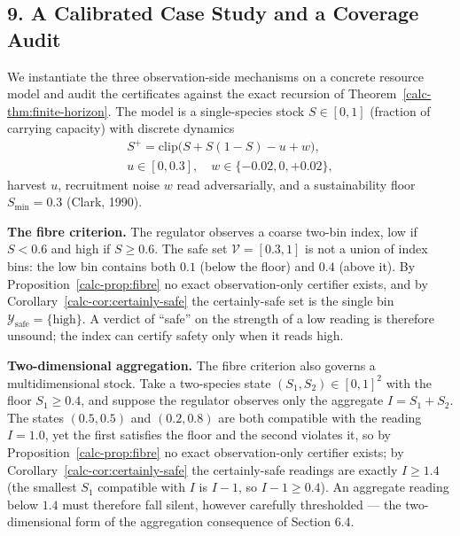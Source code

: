 \documentclass[10pt,twocolumn]{article}
\theoremstyle{definition}
\begin{document}
\subsection{9. A Calibrated Case Study and a Coverage Audit}\label{calc-case-study}

We instantiate the three observation-side mechanisms on a concrete resource model and audit the certificates against the exact recursion of Theorem~\ref{calc-thm:finite-horizon}. The model is a single-species stock \(S \in [0,1]\) (fraction of carrying capacity) with discrete dynamics
\[
\begin{gathered}
S^{+} = \mathrm{clip}\bigl(S + S(1-S) - u + w\bigr),\\
u \in [0, 0.3],\quad w \in \{-0.02, 0, +0.02\},
\end{gathered}
\]
harvest \(u\), recruitment noise \(w\) read adversarially, and a sustainability floor \(S_{\min} = 0.3\) (Clark, 1990).

\textbf{The fibre criterion.} The regulator observes a coarse two-bin index, low if \(S < 0.6\) and high if \(S \ge 0.6\). The safe set \(\mathcal{V} = [0.3, 1]\) is not a union of index bins: the low bin contains both \(0.1\) (below the floor) and \(0.4\) (above it). By Proposition~\ref{calc-prop:fibre} no exact observation-only certifier exists, and by Corollary~\ref{calc-cor:certainly-safe} the certainly-safe set is the single bin \(\mathcal{Y}_{\mathrm{safe}} = \{\text{high}\}\). A verdict of ``safe'' on the strength of a low reading is therefore unsound; the index can certify safety only when it reads high.

\textbf{Two-dimensional aggregation.} The fibre criterion also governs a multidimensional stock. Take a two-species state \((S_{1}, S_{2}) \in [0,1]^{2}\) with the floor \(S_{1} \ge 0.4\), and suppose the regulator observes only the aggregate \(I = S_{1} + S_{2}\). The states \((0.5, 0.5)\) and \((0.2, 0.8)\) are both compatible with the reading \(I = 1.0\), yet the first satisfies the floor and the second violates it, so by Proposition~\ref{calc-prop:fibre} no exact observation-only certifier exists; by Corollary~\ref{calc-cor:certainly-safe} the certainly-safe readings are exactly \(I \ge 1.4\) (the smallest \(S_{1}\) compatible with \(I\) is \(I - 1\), so \(I - 1 \ge 0.4\)). An aggregate reading below \(1.4\) must therefore fall silent, however carefully thresholded --- the two-dimensional form of the aggregation consequence of Section 6.4.
\end{document}
